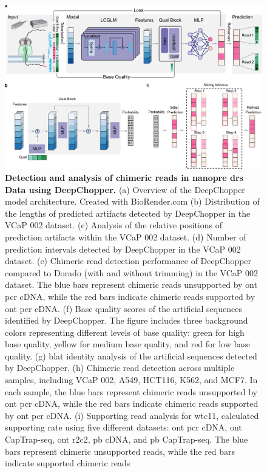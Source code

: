 \documentclass[pdflatex, sn-mathphys-num, lineno]{sn-jnl}%
\theoremstyle{thmstyleone}%
\theoremstyle{thmstyletwo}%
\theoremstyle{thmstylethree}%
\begin{document}
\begin{figure}[!h]
	\includegraphics[height=0.78\columnwidth]{figures/finals/figure1}
    \caption{{\bf  Detection and analysis of chimeric reads in nanopre \gls{drs} Data using DeepChopper.} (a) Overview of the DeepChopper model architecture. Created with BioRender.com (b) Distribution of the lengths of predicted artifacts detected by DeepChopper in the VCaP 002 dataset. (c) Analysis of the relative positions of prediction artifacts within the VCaP 002 dataset.  (d) Number of prediction intervals detected by DeepChopper in the VCaP 002 dataset. (e) Chimeric read detection performance of DeepChopper compared to Dorado (with and without trimming) in the VCaP 002 dataset. The blue bars represent chimeric reads unsupported by \gls{ont} \gls{pcr} cDNA, while the red bars indicate chimeric reads supported by \gls{ont} \gls{pcr} cDNA.  (f) Base quality scores of the artificial sequences identified by DeepChopper. The figure includes three background colors representing different levels of base quality: green for high base quality, yellow for medium base quality, and red for low base quality. (g) \gls{blat} identity analysis of the artificial sequences detected by DeepChopper. (h) Chimeric read detection across multiple samples, including VCaP 002, A549, HCT116, K562, and MCF7. In each sample, the blue bars represent chimeric reads unsupported by \gls{ont} \gls{pcr} cDNA, while the red bars indicate chimeric reads supported by \gls{ont} \gls{pcr} cDNA. (i)  Supporting read analysis for wtc11, calculated supporting rate using five different datasets: \gls{ont} \gls{pcr} cDNA, \gls{ont} CapTrap-seq, \gls{ont} \gls{r2c2}, \gls{pb} cDNA, and \gls{pb} CapTrap-seq. The blue bars represent chimeric unsupported reads, while the red bars indicate supported chimeric reads}
	\label{fig:f1}
\end{figure}
\end{document}
